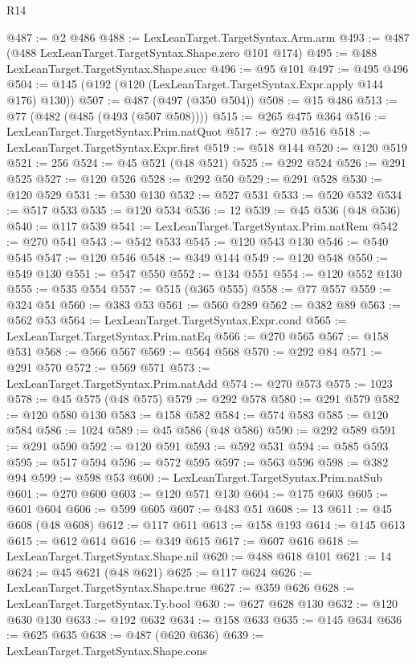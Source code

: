 \begin{lexlean}{R14}
\begin{coremodule}
@487 := @2 @486
@488 := LexLeanTarget.TargetSyntax.Arm.arm
@493 := @487 (@488 LexLeanTarget.TargetSyntax.Shape.zero @101 @174)
@495 := @488 LexLeanTarget.TargetSyntax.Shape.succ
@496 := @95 @101
@497 := @495 @496
@504 := @145 (@192 (@120 (LexLeanTarget.TargetSyntax.Expr.apply @144 @176) @130))
@507 := @487 (@497 (@350 @504))
@508 := @15 @486
@513 := @77 (@482 (@485 (@493 (@507 @508))))
@515 := @265 @475 @364
@516 := LexLeanTarget.TargetSyntax.Prim.natQuot
@517 := @270 @516
@518 := LexLeanTarget.TargetSyntax.Expr.first
@519 := @518 @144
@520 := @120 @519
@521 := 256
@524 := @45 @521 (@48 @521)
@525 := @292 @524
@526 := @291 @525
@527 := @120 @526
@528 := @292 @50
@529 := @291 @528
@530 := @120 @529
@531 := @530 @130
@532 := @527 @531
@533 := @520 @532
@534 := @517 @533
@535 := @120 @534
@536 := 12
@539 := @45 @536 (@48 @536)
@540 := @117 @539
@541 := LexLeanTarget.TargetSyntax.Prim.natRem
@542 := @270 @541
@543 := @542 @533
@545 := @120 @543 @130
@546 := @540 @545
@547 := @120 @546
@548 := @349 @144
@549 := @120 @548
@550 := @549 @130
@551 := @547 @550
@552 := @134 @551
@554 := @120 @552 @130
@555 := @535 @554
@557 := @515 (@365 @555)
@558 := @77 @557
@559 := @324 @51
@560 := @383 @53
@561 := @560 @289
@562 := @382 @89
@563 := @562 @53
@564 := LexLeanTarget.TargetSyntax.Expr.cond
@565 := LexLeanTarget.TargetSyntax.Prim.natEq
@566 := @270 @565
@567 := @158 @531
@568 := @566 @567
@569 := @564 @568
@570 := @292 @84
@571 := @291 @570
@572 := @569 @571
@573 := LexLeanTarget.TargetSyntax.Prim.natAdd
@574 := @270 @573
@575 := 1023
@578 := @45 @575 (@48 @575)
@579 := @292 @578
@580 := @291 @579
@582 := @120 @580 @130
@583 := @158 @582
@584 := @574 @583
@585 := @120 @584
@586 := 1024
@589 := @45 @586 (@48 @586)
@590 := @292 @589
@591 := @291 @590
@592 := @120 @591
@593 := @592 @531
@594 := @585 @593
@595 := @517 @594
@596 := @572 @595
@597 := @563 @596
@598 := @382 @94
@599 := @598 @53
@600 := LexLeanTarget.TargetSyntax.Prim.natSub
@601 := @270 @600
@603 := @120 @571 @130
@604 := @175 @603
@605 := @601 @604
@606 := @599 @605
@607 := @483 @51
@608 := 13
@611 := @45 @608 (@48 @608)
@612 := @117 @611
@613 := @158 @193
@614 := @145 @613
@615 := @612 @614
@616 := @349 @615
@617 := @607 @616
@618 := LexLeanTarget.TargetSyntax.Shape.nil
@620 := @488 @618 @101
@621 := 14
@624 := @45 @621 (@48 @621)
@625 := @117 @624
@626 := LexLeanTarget.TargetSyntax.Shape.true
@627 := @359 @626
@628 := LexLeanTarget.TargetSyntax.Ty.bool
@630 := @627 @628 @130
@632 := @120 @630 @130
@633 := @192 @632
@634 := @158 @633
@635 := @145 @634
@636 := @625 @635
@638 := @487 (@620 @636)
@639 := LexLeanTarget.TargetSyntax.Shape.cons

\end{coremodule}
\end{lexlean}
